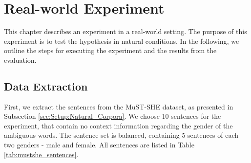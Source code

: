 \chapter{Real-world Experiment}
\label{ch:Real_Experiment} 

This chapter describes an experiment in a real-world setting. The purpose of this experiment is to test the hypothesis in natural conditions. In the following, we outline the steps for executing the
experiment and the results from the evaluation.

\section{Data Extraction}
\label{sec:Real_Experiment:Extraction}

First, we extract the sentences from the MuST-SHE dataset, as presented in Subsection \ref{sec:Setup:Natural_Corpora}. We choose 10 sentences for the experiment, that contain no context information regarding the gender of the ambiguous words. The sentence set is balanced, containing 5 sentences of each two genders - male and female. All sentences are listed in Table \ref{tab:mustshe_sentences}.

